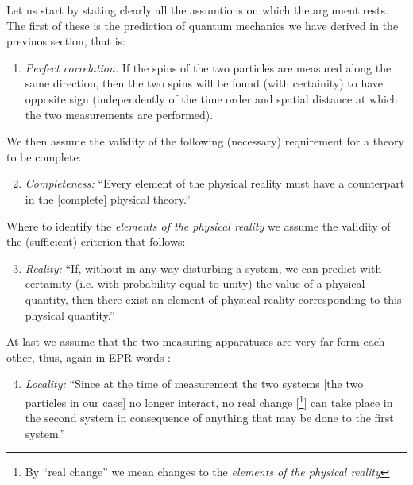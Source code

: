 Let us start by stating clearly all the assumtions on which the argument rests. The first of these is the prediction of quantum mechanics we have derived in the previuos section, that is:
\begin{enumerate}
  \renewcommand{\theenumi}{\alph{enumi}}
  \renewcommand{\labelenumi}{(\theenumi)}
\item \label{itm:epr-perfect-correlations} \textit{Perfect correlation:} If the spins of the two particles are measured along the same direction, then the two spins will be found (with certainity) to have opposite sign (independently of the time order and spatial distance at which the two measurements are performed).
\end{enumerate}
We then assume the validity of the following (necessary) requirement for a theory to be complete:
\begin{enumerate}
  \setcounter{enumi}{1}
  \renewcommand{\theenumi}{\alph{enumi}}
  \renewcommand{\labelenumi}{(\theenumi)}
\item \label{itm:epr-completeness} \textit{Completeness:} ``Every element of the physical reality must have a counterpart in the [complete] physical theory.'' \cite{PhysRev.47.777}
\end{enumerate}
Where to identify the \textit{elements of the physical reality} we assume the validity of the (sufficient) criterion that follows:
\begin{enumerate}
  \setcounter{enumi}{2}
  \renewcommand{\theenumi}{\alph{enumi}}
  \renewcommand{\labelenumi}{(\theenumi)}
\item \label{itm:epr-reality} \textit{Reality:} ``If, without in any way disturbing a system, we can predict with certainity (i.e. with probability equal to unity) the value of a physical quantity, then there exist an element of physical reality corresponding to this physical quantity.'' \cite{PhysRev.47.777}
\end{enumerate}
At last we assume that the two measuring apparatuses are very far form each other, thus, again in EPR words \cite{PhysRev.47.777}:
\begin{enumerate}
  \setcounter{enumi}{3}
  \renewcommand{\theenumi}{\alph{enumi}}
  \renewcommand{\labelenumi}{(\theenumi)}
\item \label{itm:epr-locality} \textit{Locality:} ``Since at the time of measurement the two systems [the two particles in our case] no longer interact, no real change [\footnote{By ``real change'' we mean changes to the \textit{elements of the physical reality}}] can take place in the second system in consequence of anything that may be done to the first system.''
\end{enumerate}

